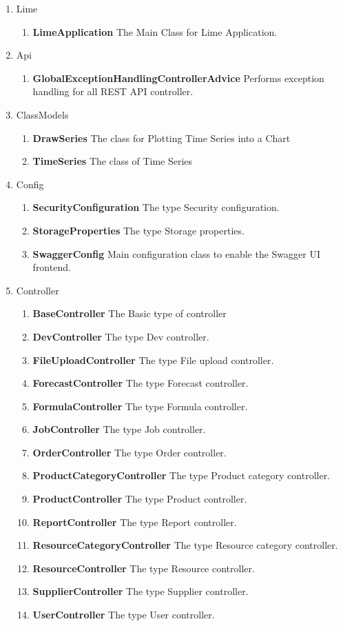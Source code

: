 \documentclass[a4paper,11pt,twoside]{report}
\theoremstyle{definition}
\begin{document}
\begin{enumerate} 
\item Lime	 
\begin{enumerate} 
\item \textbf{LimeApplication}	The Main Class for Lime Application.
\end{enumerate} 
\item Api	 
\begin{enumerate} 
\item \textbf{GlobalExceptionHandlingControllerAdvice} Performs exception handling for all REST API controller.
\end{enumerate} 
\item ClassModels	 
\begin{enumerate} 
\item \textbf{DrawSeries} The class for Plotting Time Series into a Chart
\item \textbf{TimeSeries} The class of Time Series
\end{enumerate} 
\item Config	 
\begin{enumerate} 
\item \textbf{SecurityConfiguration} The type Security configuration.
\item \textbf{StorageProperties} The type Storage properties.
\item \textbf{SwaggerConfig} Main configuration class to enable the Swagger UI frontend.
\end{enumerate} 
\item Controller	 
\begin{enumerate} 
\item \textbf{BaseController} The Basic type of controller
\item \textbf{DevController} The type Dev controller.
\item \textbf{FileUploadController} The type File upload controller.
\item \textbf{ForecastController} The type Forecast controller.
\item \textbf{FormulaController} The type Formula controller.
\item \textbf{JobController} The type Job controller.
\item \textbf{OrderController} The type Order controller.
\item \textbf{ProductCategoryController} The type Product category controller.
\item \textbf{ProductController} The type Product controller.
\item \textbf{ReportController} The type Report controller.
\item \textbf{ResourceCategoryController} The type Resource category controller.
\item \textbf{ResourceController} The type Resource controller.
\item \textbf{SupplierController} The type Supplier controller.
\item \textbf{UserController} The type User controller.


\end{enumerate}
\end{enumerate}
\end{document}
